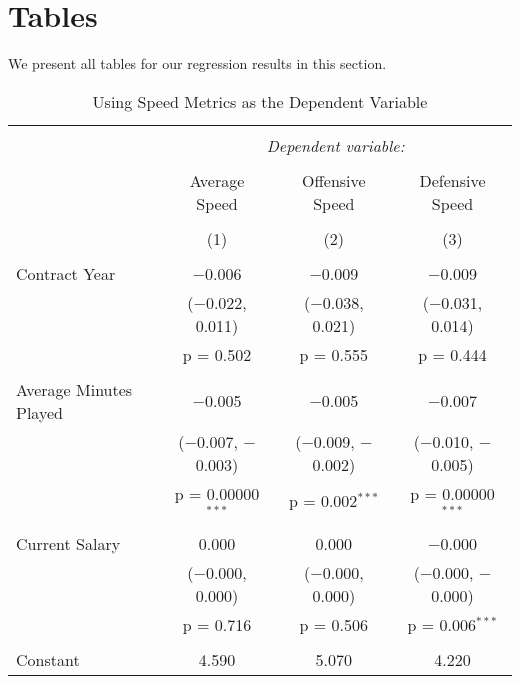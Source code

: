 \documentclass[12pt]{article}
\begin{document}
	\onehalfspacing
	
	\appendix
	
	\section{Tables} \label{sec:tab}
	
	We present all tables for our regression results in this section.
	
	\begin{landscape}
	\begin{table}[!htbp] \centering 
		\caption{Using Speed Metrics as the Dependent Variable} 
		\label{} 
		\begin{tabular}{@{\extracolsep{5pt}}lccc} 
			\\[-1.8ex]\hline 
			\hline \\[-1.8ex] 
			& \multicolumn{3}{c}{\textit{Dependent variable:}} \\ 
			\cline{2-4} 
			\\[-1.8ex] & Average Speed & Offensive Speed & Defensive Speed \\ 
			\\[-1.8ex] & (1) & (2) & (3)\\ 
			\hline \\[-1.8ex] 
			Contract Year & $-$0.006 & $-$0.009 & $-$0.009 \\ 
			& ($-$0.022, 0.011) & ($-$0.038, 0.021) & ($-$0.031, 0.014) \\ 
			& p = 0.502 & p = 0.555 & p = 0.444 \\ 
			& & & \\ 
			Average Minutes Played & $-$0.005 & $-$0.005 & $-$0.007 \\ 
			& ($-$0.007, $-$0.003) & ($-$0.009, $-$0.002) & ($-$0.010, $-$0.005) \\ 
			& p = 0.00000$^{***}$ & p = 0.002$^{***}$ & p = 0.00000$^{***}$ \\ 
			& & & \\ 
			Current Salary & 0.000 & 0.000 & $-$0.000 \\ 
			& ($-$0.000, 0.000) & ($-$0.000, 0.000) & ($-$0.000, $-$0.000) \\ 
			& p = 0.716 & p = 0.506 & p = 0.006$^{***}$ \\ 
			& & & \\ 
			Constant & 4.590 & 5.070 & 4.220 \\ 

\end{tabular}
\end{table}
\end{landscape}
\end{document}

